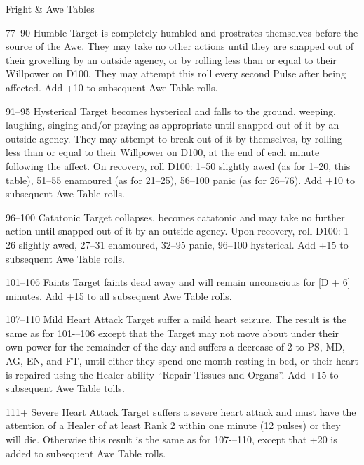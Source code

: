 \begin{Tables}{Fright \& Awe Tables}
\begin{multicols}{3}
\begin{Description}
\item[77--90] Humble Target is completely humbled and prostrates
  themselves before the source of the Awe. They may take no other
  actions until they are snapped out of their grovelling by an outside
  agency, or by rolling less than or equal to their Willpower on
  D100. They may attempt this roll every second Pulse after being
  affected. Add +10 to subsequent Awe Table rolls.

\item[91--95] Hysterical Target becomes hysterical and falls to the
  ground, weeping, laughing, singing and/or praying as appropriate
  until snapped out of it by an outside agency. They may attempt to
  break out of it by themselves, by rolling less than or equal to
  their Willpower on D100, at the end of each minute following the
  affect. On recovery, roll D100: 1–50 slightly awed (as for 1–20,
  this table), 51–55 enamoured (as for 21–25), 56–100 panic (as for
  26–76). Add +10 to subsequent Awe Table rolls.

\item[96--100] Catatonic Target collapses, becomes catatonic and may
  take no further action until snapped out of it by an outside
  agency. Upon recovery, roll D100: 1--26 slightly awed, 27--31
  enamoured, 32--95 panic, 96--100 hysterical. Add +15 to subsequent
  Awe Table rolls.

\item[101--106] Faints Target faints dead away and will remain
  unconscious for [D + 6] minutes. Add +15 to all subsequent Awe Table
  rolls.

\item[107--110] Mild Heart Attack Target suffer a mild heart
  seizure. The result is the same as for 101-–106 except that the
  Target may not move about under their own power for the remainder of
  the day and suffers a decrease of 2 to PS, MD, AG, EN, and FT, until
  either they spend one month resting in bed, or their heart is
  repaired using the Healer ability “Repair Tissues and Organs”. Add
  +15 to subsequent Awe Table tolls.

\item[111+] Severe Heart Attack Target suffers a severe heart attack
  and must have the attention of a Healer of at least Rank 2 within
  one minute (12 pulses) or they will die. Otherwise this result is
  the same as for 107-–110, except that +20 is added to subsequent Awe
  Table rolls.

\end{Description}


\end{multicols}
\end{Tables}
